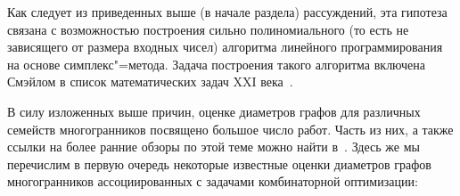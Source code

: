 Как следует из приведенных выше (в начале раздела) рассуждений,
эта гипотеза связана с возможностью построения сильно полиномиального (то есть не зависящего от размера входных чисел) алгоритма линейного программирования на основе симплекс"=метода.
Задача построения такого алгоритма включена Смэйлом в список математических задач XXI века~\cite{Smale:1998}.


В силу изложенных выше причин, оценке диаметров графов для различных семейств многогранников посвящено большое число работ.
Часть из них, а также ссылки на более ранние обзоры по этой теме можно найти в~\cite{Kim:2010,Santos:2013}. 
Здесь же мы перечислим в первую очередь некоторые известные оценки диаметров графов многогранников ассоциированных с задачами комбинаторной оптимизации:
